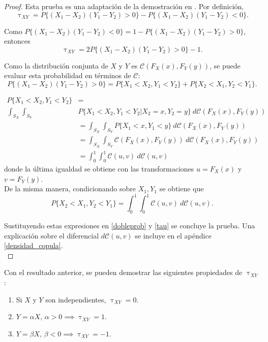 \documentclass[11pt,a4paper]{article}
\newcommand{\C}{\mathcal{C}}
\begin{document}
\begin{proof} Esta prueba es una adaptación de la demostración en \citet{nelsen}.
Por definición, $$\uptau_{XY} = P\{(X_1-X_2)(Y_1-Y_2) > 0\} - P\{(X_1-X_2)(Y_1-Y_2) < 0\}.$$

Como $P\{(X_1-X_2)(Y_1-Y_2) < 0\} = 1-P\{(X_1-X_2)(Y_1-Y_2) > 0\}$, entonces
\begin{equation} \label{tau}
\uptau_{XY} = 2P\{(X_1-X_2)(Y_1-Y_2) > 0\} - 1.
\end{equation}

Como la distribución conjunta de $X$ y $Y$ es $\C(F_X(x), F_Y(y))$, se puede evaluar esta probabilidad en términos de $\C$:
\begin{equation} \label{dobleprob}
P\{(X_1-X_2)(Y_1-Y_2) > 0\} = P\{X_1<X_2, Y_1<Y_2\} + P\{X_2<X_1, Y_2<Y_1\}.
\end{equation}

\begin{align*}
P\{X_1 < X_2, Y_1 < Y_2\} &=\\
\int_{S_X} \int_{S_Y} &P\{X_1 < X_2, Y_1 < Y_2 | X_2 = x, Y_2 = y\} \ d\C(F_X(x), F_Y(y))\\
&= \int_{S_X} \int_{S_Y} P\{X_1 < x, Y_1 < y\} \ d\C(F_X(x), F_Y(y))\\
&= \int_{S_X} \int_{S_Y} \C(F_X(x), F_Y(y)) \ d\C(F_X(x), F_Y(y))\\
&= \int_0^1 \int_0^1 \C(u, v) \ d\C(u, v)
\end{align*}
donde la última igualdad se obtiene con las transformaciones $u = F_X(x)$ y $v = F_Y(y)$.\\

De la misma manera, condicionando sobre $X_1, Y_1$ se obtiene que $$P\{X_2 < X_1, Y_2 < Y_1\} = \int_0^1 \int_0^1 \C(u, v) \ d\C(u, v).$$

Sustituyendo estas expresiones en \eqref{dobleprob} y \eqref{tau} se concluye la prueba. Una explicación sobre el diferencial $d\C(u, v)$ se incluye en el apéndice \ref{densidad_copula}.\\
\end{proof}

Con el resultado anterior, se pueden demostrar las siguientes propiedades de $\uptau_{XY}$ \citep{nelsen}:

\begin{enumerate}
\item Si $X$ y $Y$ son independientes, $\uptau_{XY} = 0$.
\item $Y = \alpha X$, $\alpha > 0 \implies \uptau_{XY} = 1$.
\item $Y = \beta X$, $\beta < 0 \implies \uptau_{XY} = -1$.
\end{enumerate}
\end{document}

